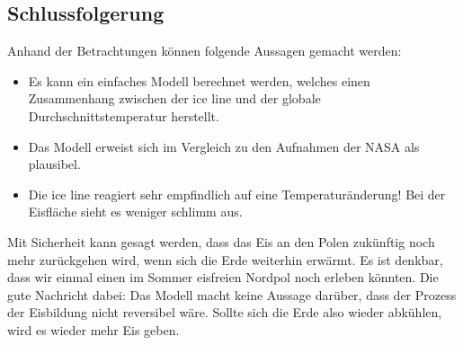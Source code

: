 \begin{refsection}
\section{Schlussfolgerung}
Anhand der Betrachtungen können folgende Aussagen gemacht werden:
\begin{itemize}
	\item Es kann ein einfaches Modell berechnet werden, welches einen Zusammenhang zwischen der ice line und der globale Durchschnittstemperatur herstellt.
	\item Das Modell erweist sich im Vergleich zu den Aufnahmen der NASA als plausibel.
	\item Die ice line reagiert sehr empfindlich auf eine Temperaturänderung! Bei der Eisfläche sieht es weniger schlimm aus. 
\end{itemize}
Mit Sicherheit kann gesagt werden, dass das Eis an den Polen zukünftig noch mehr zurückgehen wird, wenn sich die Erde weiterhin erwärmt. Es ist denkbar, dass wir einmal einen im Sommer eisfreien Nordpol noch erleben könnten. Die gute Nachricht dabei: Das Modell macht keine Aussage darüber, dass der Prozess der Eisbildung nicht reversibel wäre. Sollte sich die Erde also wieder abkühlen, wird es wieder mehr Eis geben.
\printbibliography[heading=subbibliography]
\end{refsection}

